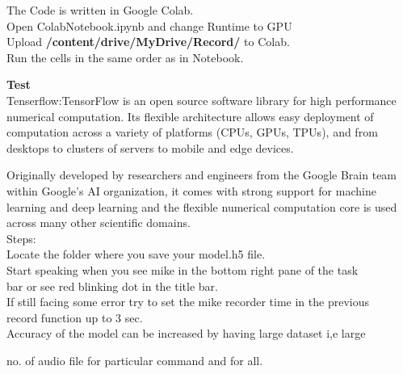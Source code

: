 \documentclass[a4paper,12pt]{article}
\begin{document}
The Code is written in Google Colab.\\

Open ColabNotebook.ipynb and change Runtime to GPU\\

Upload \textbf{/content/drive/MyDrive/Record/} to Colab.\\

Run the cells in the same order as in Notebook.\\

\pagebreak

\textbf{Test}\\


Tenserflow:TensorFlow is an open source software library for high performance numerical computation. Its flexible architecture allows easy deployment of computation across a variety of platforms (CPUs, GPUs, TPUs), and from desktops to clusters of servers to mobile and edge devices.

Originally developed by researchers and engineers from the Google Brain team within Google's AI organization, it comes with strong support for machine learning and deep learning and the flexible numerical computation core is used across many other scientific domains.\\

Steps:\\

Locate the folder where you save your model.h5 file.\\

Start speaking when you see mike in the bottom right pane of the task\\

bar or see red blinking dot in the title bar.\\

If still facing some error try to set the mike recorder time in the previous\\

 record function up to 3 sec.\\
 
Accuracy of the model can be increased by having large dataset i,e large 

 no. of audio file for particular command and for all.\\
 
 
 
 
\end{document}
